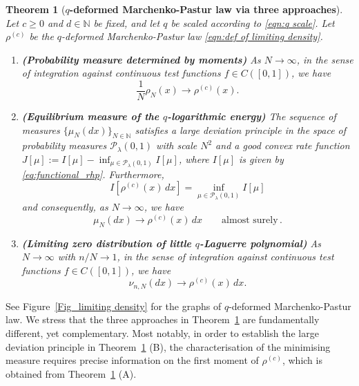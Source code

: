 \documentclass{amsart}
\theoremstyle{plain}
\newtheorem{thm}{Theorem}[section]
\theoremstyle{remark}
\numberwithin{equation}{section}
\begin{document}
\begin{thm}[\textbf{$q$-deformed Marchenko-Pastur law via three approaches}]\label{Thm:limiting density in growth regime}
Let $c \ge 0$ and $d \in \mathbb{N}$ be fixed, and let $q$ be scaled according to \eqref{eqn:q scale}. Let $\rho^{(c)}$ be the $q$-deformed Marchenko-Pastur law \eqref{eqn:def of limiting density}. 
\begin{enumerate}[label = \textup{(\Alph*)}]
    \item \textup{\textbf{(Probability measure determined by moments)}} 
    As $N \to \infty$, in the sense of integration against continuous test functions $f \in C([0,1])$, we have 
\begin{equation}
    \frac{1}{N}\rho_{N}( x ) \to  \rho^{ (c) }( x ).  
\end{equation} 
    \item \textup{\textbf{(Equilibrium measure of the $q$-logarithmic energy)}} \label{thm:point_b}
    The sequence of measures $ \{ \mu_N(dx) \}_{N\in\mathbb{N}}$ satisfies a large deviation principle in the space of probability measures $\mathcal{P}_{\lambda}(0,1)$ with scale $N^2$ and a good convex rate function $J[\mu] := I[\mu] - \inf_{\mu\in\mathcal{P}_{\lambda}(0,1)} I[\mu]$, where $I[\mu]$ is given by \eqref{eq:functional_rhp}. 
    Furthermore, 
    \begin{equation}
    I[\rho^{(c)}(x)\,dx] = \inf_{\mu\in\mathcal{P}_{\lambda}(0,1)} I[\mu]
    \end{equation}
    and consequently, as $N \to \infty$, we have 
    \begin{equation} 
    \mu_N(dx)   \to \rho^{(c)}(x)\,dx \qquad \text{almost surely}\,.
    \end{equation} 
\item \textup{\textbf{(Limiting zero distribution of little $q$-Laguerre polynomial)}} As $N \to \infty$ with $n/N\rightarrow1$, in the sense of integration against continuous test functions $f \in C([0,1])$, we have  
\begin{equation}
     \nu_{n,N}(dx) \to  \rho^{(c)}(x)\,dx. 
\end{equation} 
\end{enumerate} 
\end{thm}

See Figure~\ref{Fig_limiting density} for the graphs of $q$-deformed Marchenko-Pastur law.  We stress that the three approaches in Theorem~\ref{Thm:limiting density in growth regime} are fundamentally different, yet complementary. Most notably, in order to establish the large deviation principle in Theorem~\ref{Thm:limiting density in growth regime} (B), the characterisation of the minimising measure requires precise information on the first moment of $\rho^{(c)}$, which is obtained from Theorem~\ref{Thm:limiting density in growth regime} (A). 
\end{document}
